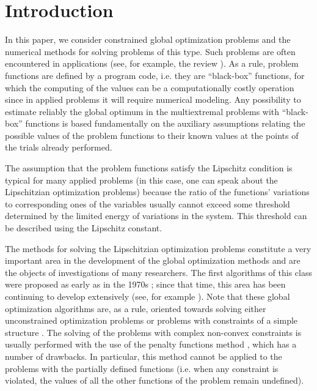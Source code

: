 \documentclass[review]{elsarticle}
\begin{document}
\section{Introduction}
	In this paper, we consider constrained global optimization problems and the numerical methods for solving problems of this type. Such problems are often encountered in applications (see, for example, the review \cite{Pinter2006}). As a rule, problem functions are defined by a program code, i.e. they are “black-box” functions, for which the computing of the values can be a computationally costly operation since in applied problems it will require  numerical modeling. Any  possibility to estimate reliably the global optimum in the multiextremal problems with “black-box” functions is based fundamentally on the auxiliary assumptions relating the possible values of the problem functions to their known values at the points of the trials already performed.
	
	The assumption that the problem functions satisfy the Lipschitz condition is typical for many applied problems (in this case, one can speak about the Lipschitzian optimization problems) because the ratio of the functions’ variations to corresponding ones of the variables usually cannot exceed some threshold determined by the limited energy of variations in the system. This threshold can be described using the Lipschitz constant.
	
	The methods for solving the Lipschitzian optimization problems constitute a very important area in the development of the global optimization methods and are the objects of investigations of many researchers. The first algorithms of this class were proposed as early as in the 1970s \cite{Evtushenko1971, Piyavskii1972, Shubert1972, Strongin1970}; since that time, this area has been continuing to develop extensively (see, for example \cite{Evtushenko2009, Evtushenko2013, Strongin2000, Sergeyev2013, Jones2009}). Note that these global optimization algorithms are, as a rule, oriented towards solving either  unconstrained optimization problems 
	\cite{Zilinskas, Sergeyev, Pinter, Jones}
or problems with constraints of a simple structure \cite{Vaz2009, Paulavicius2016}. The solving of the problems with complex non-convex constraints is usually performed with the use of the penalty functions method \cite{Stripinis2019, Pillo2012, Pillo2016}, which has a number of drawbacks.  In particular, this method cannot be applied to the problems with the partially defined functions (i.e. when any constraint is violated, the values of all the other functions of the problem remain undefined).
	
\end{document}
